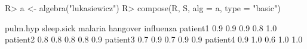 \begin{Schunk}
% --begin: "comp.basic"
\begin{Sinput}
R> a <- algebra("lukasiewicz")
R> compose(R, S, alg = a, type = "basic")
\end{Sinput}
\begin{Soutput}
         pulm.hyp sleep.sick malaria hangover influenza
patient1      0.9        0.9     0.9      0.8       1.0
patient2      0.8        0.8     0.8      0.8       0.9
patient3      0.7        0.9     0.7      0.9       0.9
patient4      0.9        1.0     0.6      1.0       1.0
\end{Soutput}
%
% --end: "comp.basic"
\end{Schunk}
